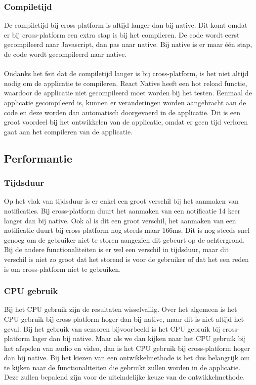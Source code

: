 \subsubsection{Compiletijd}
De compiletijd bij cross-platform is altijd langer dan bij native. Dit komt omdat er bij cross-platform
een extra stap is bij het compileren. De code wordt eerst gecompileerd naar Javascript, dan pas naar native.
Bij native is er maar één stap, de code wordt gecompileerd naar native.
\\\\
Ondanks het feit dat de compiletijd langer is bij cross-platform, is het niet altijd nodig om de applicatie te compileren.
React Native heeft een hot reload functie, waardoor de applicatie niet gecompileerd moet worden bij het testen.
Eenmaal de applicatie gecompileerd is, kunnen er veranderingen worden aangebracht aan de code en deze worden dan
automatisch doorgevoerd in de applicatie. Dit is een groot voordeel bij het ontwikkelen van de applicatie,
omdat er geen tijd verloren gaat aan het compileren van de applicatie.

\subsection{Performantie}
\subsubsection{Tijdsduur}
Op het vlak van tijdsduur is er enkel een groot verschil bij het aanmaken van notificaties.
Bij cross-platform duurt het aanmaken van een notificatie 14 keer langer dan bij native.
Ook al is dit een groot verschil, het aanmaken van een notificatie duurt bij cross-platform 
nog steeds maar 166ms. Dit is nog steeds snel genoeg om de gebruiker niet te storen 
aangezien dit gebeurt op de achtergrond. Bij de andere functionaliteiten is er wel een verschil
in tijdsduur, maar dit verschil is niet zo groot dat het storend is voor de gebruiker of dat het een 
reden is om cross-platform niet te gebruiken.

\subsubsection{CPU gebruik}
Bij het CPU gebruik zijn de resultaten wisselvallig. Over het algemeen is het CPU gebruik bij cross-platform
hoger dan bij native, maar dit is niet altijd het geval. Bij het gebruik van sensoren bijvoorbeeld is het CPU gebruik
bij cross-platform lager dan bij native. Maar als we dan kijken naar het CPU gebruik bij het afspelen van audio en 
video, dan is het CPU gebruik bij cross-platform hoger dan bij native. Bij het kiezen van een ontwikkelmethode is het 
dus belangrijk om te kijken naar de functionaliteiten die gebruikt zullen worden in de applicatie. 
Deze zullen bepalend zijn voor de uiteindelijke keuze van de ontwikkelmethode.

